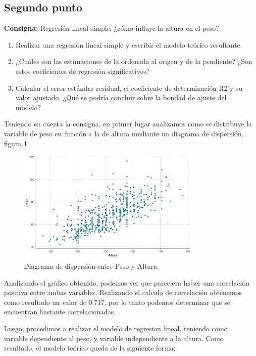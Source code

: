 \documentclass{article} %
\begin{document}
\subsection{Segundo punto}

\textbf{Consigna:} Regresión lineal simple: ¿cómo influye la altura en el peso?

\begin{enumerate}[label=(\alph*)]
\item Realizar una regresión lineal simple y escribir el modelo teórico resultante.
\item ¿Cuáles son las estimaciones de la ordenada al origen y de la pendiente? ¿Son estos coeficientes de regresión significativos?
\item Calcular el error estándar residual, el coeficiente de determinación R2 y su valor ajustado. ¿Qué se podría concluir sobre la bondad de ajuste del modelo?
\end{enumerate}

Teniendo en cuenta la consigna, en primer lugar analizamos como se distribuye la variable de peso en función a la de altura mediante un diagrama de dispersión, figura \ref{fig:scatter1}. 


\begin{figure}[H]
	\centering
	\includegraphics[width=0.8\textwidth]{images/1-2 Scatter}
	\caption{Diagrama de dispersión entre Peso y Altura.}
	\label{fig:scatter1}
\end{figure}

Analizando el gráfico obtenido, podemos ver que pareciera haber una correlación positiva entre ambas variables. Realizando el calculo de correlación obtenemos como resultado un valor de 0.717, por lo tanto podemos determinar que se encuentran bastante correlacionadas. 

Luego, procedimos a realizar el modelo de regresion lineal, teniendo como variable dependiente al peso, y variable independiente a la altura. Como resultado, el modelo teórico queda de la siguiente forma:
\end{document}
